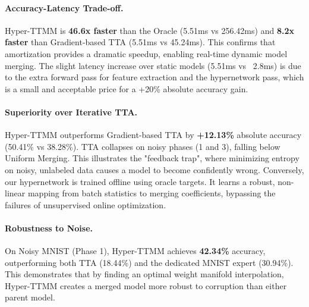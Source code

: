 \documentclass{article}
\theoremstyle{plain}
\theoremstyle{definition}
\theoremstyle{remark}
\begin{document}
\paragraph{Accuracy-Latency Trade-off.}
Hyper-TTMM is \textbf{46.6x faster} than the Oracle (5.51ms vs 256.42ms) and \textbf{8.2x faster} than Gradient-based TTA (5.51ms vs 45.24ms). This confirms that amortization provides a dramatic speedup, enabling real-time dynamic model merging. The slight latency increase over static models (5.51ms vs ~2.8ms) is due to the extra forward pass for feature extraction and the hypernetwork pass, which is a small and acceptable price for a +20\% absolute accuracy gain.

\paragraph{Superiority over Iterative TTA.}
Hyper-TTMM outperforms Gradient-based TTA by \textbf{+12.13\%} absolute accuracy (50.41\% vs 38.28\%). TTA collapses on noisy phases (1 and 3), falling below Uniform Merging. This illustrates the "feedback trap", where minimizing entropy on noisy, unlabeled data causes a model to become confidently wrong. Conversely, our hypernetwork is trained offline using oracle targets. It learns a robust, non-linear mapping from batch statistics to merging coefficients, bypassing the failures of unsupervised online optimization.

\paragraph{Robustness to Noise.}
On Noisy MNIST (Phase 1), Hyper-TTMM achieves \textbf{42.34\%} accuracy, outperforming both TTA (18.44\%) and the dedicated MNIST expert (30.94\%). This demonstrates that by finding an optimal weight manifold interpolation, Hyper-TTMM creates a merged model more robust to corruption than either parent model.
\end{document}
